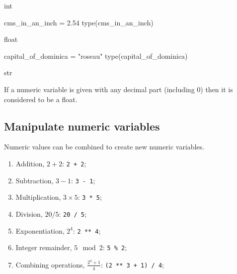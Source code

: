 \begin{raw}
int
\end{raw}







\begin{pyin}
cms_in_an_inch = 2.54
type(cms_in_an_inch)
\end{pyin}





\begin{raw}
float
\end{raw}







\begin{pyin}
capital_of_dominica = "roseau"
type(capital_of_dominica)
\end{pyin}





\begin{raw}
str
\end{raw}

\begin{raw}
If a numeric variable is given with any decimal part (including 0) then it is
considered to be a float.
\end{raw}



\subsection{Manipulate numeric variables}
\label{\detokenize{building-tools/01-variables-conditionals-loops/how/main:how-to-manipulate-numeric-variables}}

Numeric values can be combined to create new numeric variables.
\begin{enumerate}

\item 

Addition, \(2 + 2\): \texttt{2 + 2};

\item 

Subtraction, \(3 - 1\): \texttt{3 - 1};

\item 

Multiplication, \(3 \times 5\): \texttt{3 * 5};

\item 

Division, \(20 / 5\): \texttt{20 / 5};

\item 

Exponentiation, \(2 ^ 4\): \texttt{2 ** 4};

\item 

Integer remainder, \(5 \mod 2\): \texttt{5 \% 2};

\item 

Combining operations, \(\frac{2 ^ 3 + 1}{4}\): \texttt{(2 ** 3 + 1) / 4};

\end{enumerate}


